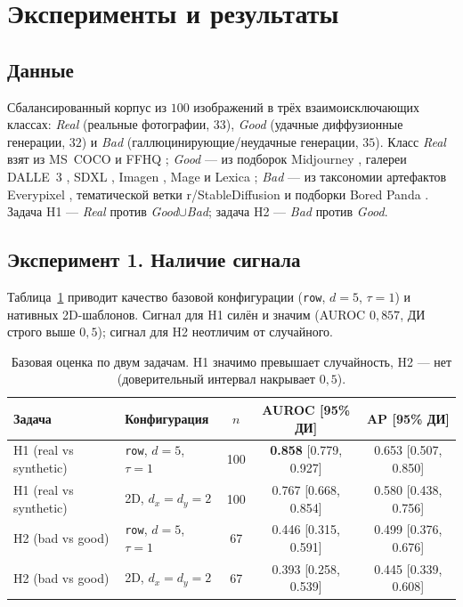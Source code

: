 \documentclass[14pt]{extarticle}
\theoremstyle{plain}
\numberwithin{equation}{section}
\numberwithin{figure}{section}
\numberwithin{table}{section}
\begin{document}
\section{Эксперименты и результаты}\label{sec:results}

\subsection{Данные}
Сбалансированный корпус из $100$ изображений в трёх взаимоисключающих классах:
\emph{Real} (реальные фотографии, $33$), \emph{Good} (удачные диффузионные
генерации, $32$) и \emph{Bad} (галлюцинирующие/неудачные генерации, $35$). Класс
\emph{Real} взят из MS~COCO \citep{Lin2014COCO} и FFHQ \citep{Karras2019FFHQ};
\emph{Good} — из подборок Midjourney \citep{MidjourneyWebsite}, галереи
DALL\textperiodcentered E~3 \citep{DALLE3Gallery}, SDXL \citep{Podell2023SDXL},
Imagen \citep{Saharia2022Imagen}, Mage \citep{MageSpace} и Lexica
\citep{LexicaArt}; \emph{Bad} — из таксономии артефактов Everypixel
\citep{EverypixelHalluc}, тематической ветки r/StableDiffusion
\citep{RedditStableFail} и подборки Bored Panda \citep{BoredPandaFails}.
Задача H1 — \emph{Real} против \emph{Good}$\cup$\emph{Bad}; задача H2 —
\emph{Bad} против \emph{Good}.

\subsection{Эксперимент 1. Наличие сигнала}\label{sec:e1}
Таблица~\ref{tab:e1} приводит качество базовой конфигурации (\texttt{row},
$d=5$, $\tau=1$) и нативных 2D-шаблонов. Сигнал для H1 силён и значим
(AUROC $0{,}857$, ДИ строго выше $0{,}5$); сигнал для H2 неотличим от
случайного.

\begin{table}[h!]
\centering
\caption{Базовая оценка по двум задачам. H1 значимо превышает случайность,
H2 — нет (доверительный интервал накрывает $0{,}5$).}
\label{tab:e1}
\begin{tabular}{@{}llccc@{}}
\toprule
Задача & Конфигурация & $n$ & AUROC [95\% ДИ] & AP [95\% ДИ] \\
\midrule
H1 (real vs synthetic) & \texttt{row}, $d{=}5$, $\tau{=}1$ & 100 & \textbf{0.858} [0.779, 0.927] & 0.653 [0.507, 0.850] \\
H1 (real vs synthetic) & 2D, $d_x{=}d_y{=}2$               & 100 & 0.767 [0.668, 0.854] & 0.580 [0.438, 0.756] \\
H2 (bad vs good)       & \texttt{row}, $d{=}5$, $\tau{=}1$ & 67  & 0.446 [0.315, 0.591] & 0.499 [0.376, 0.676] \\
H2 (bad vs good)       & 2D, $d_x{=}d_y{=}2$               & 67  & 0.393 [0.258, 0.539] & 0.445 [0.339, 0.608] \\
\bottomrule
\end{tabular}

\end{table}
\end{document}
